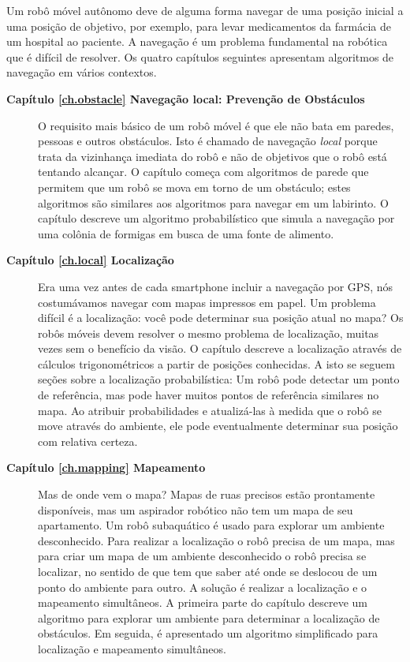 Um robô móvel autônomo deve de alguma forma navegar de uma posição inicial a uma posição de objetivo, por exemplo, para levar medicamentos da farmácia de um hospital ao paciente. A navegação é um problema fundamental na robótica que é difícil de resolver. Os quatro capítulos seguintes apresentam algoritmos de navegação em vários contextos.
\begin{description}
\item [\textbf{Capítulo \ref{ch.obstacle} Navegação local: Prevenção de Obstáculos}] O requisito mais básico de um robô móvel é que ele não bata em paredes, pessoas e outros obstáculos. Isto é chamado de navegação \emph{local} porque trata da vizinhança imediata do robô e não de objetivos que o robô está tentando alcançar. O capítulo começa com algoritmos de parede que permitem que um robô se mova em torno de um obstáculo; estes algoritmos são similares aos algoritmos para navegar em um labirinto. O capítulo descreve um algoritmo probabilístico que simula a navegação por uma colônia de formigas em busca de uma fonte de alimento.
\item [\textbf{Capítulo \ref{ch.local} Localização}] Era uma vez antes de cada smartphone incluir a navegação por GPS, nós costumávamos navegar com mapas impressos em papel. Um problema difícil é a localização: você pode determinar sua posição atual no mapa? Os robôs móveis devem resolver o mesmo problema de localização, muitas vezes sem o benefício da visão. O capítulo descreve a localização através de cálculos trigonométricos a partir de posições conhecidas. A isto se seguem seções sobre a localização probabilística: Um robô pode detectar um ponto de referência, mas pode haver muitos pontos de referência similares no mapa. Ao atribuir probabilidades e atualizá-las à medida que o robô se move através do ambiente, ele pode eventualmente determinar sua posição com relativa certeza.

\item [\textbf{Capítulo \ref{ch.mapping} Mapeamento}] Mas de onde vem o mapa? Mapas de ruas precisos estão prontamente disponíveis, mas um aspirador robótico não tem um mapa de seu apartamento. Um robô subaquático é usado para explorar um ambiente desconhecido. Para realizar a localização o robô precisa de um mapa, mas para criar um mapa de um ambiente desconhecido o robô precisa se localizar, no sentido de que tem que saber até onde se deslocou de um ponto do ambiente para outro. A solução é realizar a localização e o mapeamento simultâneos. A primeira parte do capítulo descreve um algoritmo para explorar um ambiente para determinar a localização de obstáculos. Em seguida, é apresentado um algoritmo simplificado para localização e mapeamento simultâneos.


\end{description}
